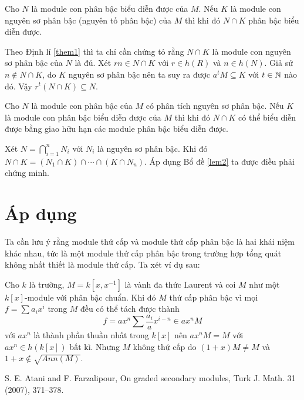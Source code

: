 \begin{lemma}
    \label{lem2}
    Cho $N$ là module con phân bậc biểu diễn được của $M$. Nếu $K$ là module con nguyên sơ phân bậc (nguyên tố phân bậc) của $M$ thì khi đó $N \cap K$ phân bậc biểu diễn được.
\end{lemma}
\startproof Theo Định lí \ref{them1} thì ta chỉ cần chứng tỏ rằng $N \cap K$ là module con nguyên sơ phân bậc của $N$ là đủ. Xét $rn \in N \cap K$ với $r \in h(R)$ và $n \in h(N)$. Giả sử $n \notin N \cap K$, do $K$ nguyên sơ phân bậc nên ta suy ra được $a^tM \subseteq K$ với $t \in \mathbb N$ nào đó. Vậy $r^t(N \cap K) \subseteq N$. \QED

\begin{theorem}
    Cho $N$ là module con phân bậc của $M$ có phân tích nguyên sơ phân bậc. Nếu $K$ là module con phân bậc biểu diễn được của $M$ thì khi đó $N \cap K$ có thể biểu diễn được bằng giao hữu hạn các module phân bậc biểu diễn được.
\end{theorem}
\startproof Xét $N = \bigcap_{i=1}^n N_i$ với $N_i$ là nguyên sơ phân bậc. Khi đó $N \cap K = (N_1 \cap K) \cap \cdots \cap (K \cap N_n)$. Áp dụng Bổ đề \ref{lem2} ta được điều phải chứng minh. \QED

\section{Áp dụng}
Ta cần lưu ý rằng module thứ cấp và module thứ cấp phân bậc là hai khái niệm khác nhau, tức là một module thứ cấp phân bậc trong trường hợp tổng quát không nhất thiết là module thứ cấp. Ta xét ví dụ sau:
\begin{example}
    Cho $k$ là trường, $M = k[x,x^{-1}]$ là vành đa thức Laurent và coi $M$ như một $k[x]$-module với phân bậc chuẩn. Khi đó $M$ thứ cấp phân bậc vì mọi $f = \sum a_ix^i$ trong $M$ đều có thể tách được thành
    $$
        f = ax^n\sum \frac{a_i}{a}x^{i-n} \in ax^nM
    $$
    với $ax^n$ là thành phần thuần nhất trong $k[x]$ nên $ax^n M = M$ với $ax^n \in h(k[x])$ bất kì. Nhưng $M$ không thứ cấp do $(1+x)M \neq M$ và $1+x \notin \sqrt{Ann(M)}$.
\end{example}

\renewcommand\refname{Tài liệu tham khảo}
\begin{thebibliography}{9}
     S. E. Atani and F. Farzalipour, On graded secondary modules, Turk J. Math. 31 (2007), 371–378.
\end{thebibliography}

